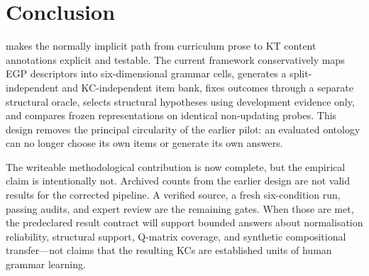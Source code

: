 \section{Conclusion}

\system makes the normally implicit path from curriculum prose to KT content
annotations explicit and testable.  The current framework conservatively maps
EGP descriptors into six-dimensional grammar cells, generates a
split-independent and KC-independent item bank, fixes outcomes through a
separate structural oracle, selects structural hypotheses using development
evidence only, and compares frozen representations on identical non-updating
probes.  This design removes the principal circularity of the earlier pilot:
an evaluated ontology can no longer choose its own items or generate its own
answers.

The writeable methodological contribution is now complete, but the empirical
claim is intentionally not.  Archived counts from the earlier design are not
valid results for the corrected pipeline.  A verified source, a fresh
six-condition run, passing audits, and expert review are the remaining gates.
When those are met, the predeclared result contract will support bounded
answers about normalisation reliability, structural support, Q-matrix
coverage, and synthetic compositional transfer---not claims that the resulting
KCs are established units of human grammar learning.
